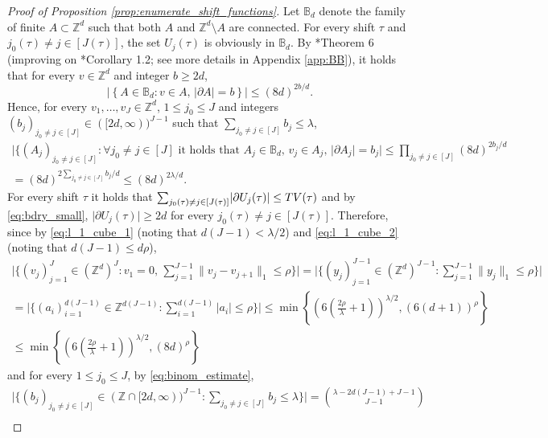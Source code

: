 \documentclass[11pt, reqno]{amsart}
\numberwithin{equation}{section}
\begin{document}
\begin{proof}[Proof of Proposition \ref{prop:enumerate_shift_functions}]
Let ${\mathbb B}_d$ denote the family of finite $A\subset{\mathbb Z}^d$ such that both $A$ and ${\mathbb Z}^d\setminus A$ are connected.
For every shift $\tau$ and $j_0(\tau)\neq j\in[J(\tau)]$, the set $U_j(\tau)$ is obviously in ${\mathbb B}_d$.
By \cite{BB}*{Theorem 6} (improving on \cite{LM}*{Corollary 1.2}; see more details in Appendix \ref{app:BB}), it holds that for every $v\in{\mathbb Z}^d$ and integer $b\geq 2d$, 
\begin{equation}\label{eq:BB}
\lvert \left\{A\in{\mathbb B}_d\colon v\in A,\,\lvert\partial A \rvert=b \right\} \rvert\leq (8d)^{2b/d}.
\end{equation}
Hence, for every $v_1,\ldots,v_J\in{\mathbb Z}^d$, $1\leq j_0\leq J$ and integers $(b_j)_{j_0\neq j\in[J]}\in([2d,\infty))^{J-1}$ such that $\sum_{j_0\neq j\in[J]}b_j\leq\lambda$,
\begin{multline*}
\lvert\{(A_j)_{j_0\neq j\in[J]}\colon \forall j_0\neq j\in[J] \text{ it holds that } A_j\in{\mathbb B}_d,\,v_j\in A_j,\,\lvert\partial A_j\rvert=b_j\rvert\leq \prod_{j_0\neq j\in[J]}(8d)^{2b_j/d}\\
=(8d)^{2\sum_{j_0\neq j\in[J]}b_j/d}\leq(8d)^{2\lambda/d}. 
\end{multline*}
For every shift $\tau$ it holds that $\sum_{j_0(\tau)\neq j\in[J(\tau)]} \lvert\partial U_j(\tau)\rvert\leq {\rm TV}(\tau)$ and by \eqref{eq:bdry_small}, $\lvert\partial U_j(\tau)\rvert\geq 2d$ for every $j_0(\tau)\neq j\in[J(\tau)]$. 
Therefore, since by \eqref{eq:l_1_cube_1} (noting that $d(J-1)<\lambda/2$) and  \eqref{eq:l_1_cube_2} (noting that $d(J-1)\leq d\rho$),
\begin{multline*}
\lvert\{(v_j)_{j=1}^J\in({\mathbb Z}^d)^J\colon  v_1=0,\,\sum_{j=1}^{J-1}\lVert v_j-v_{j+1}\rVert_1\leq\rho\}\rvert=\lvert\{(y_j)_{j=1}^{J-1}\in({\mathbb Z}^d)^{J-1}\colon  \sum_{j=1}^{J-1}\lVert y_j\rVert_1\leq\rho\}\rvert\\
=\lvert\{(a_i)_{i=1}^{d(J-1)}\in{\mathbb Z}^{d(J-1)}\colon \sum_{i=1}^{d(J-1)}\lvert a_i\rvert\leq\rho\}\rvert\leq \min\left\{\left(6\left(\frac{2\rho}{\lambda}+1\right)\right)^{\lambda/2},\left(6(d+1)\right)^{\rho}\right\}\\
\leq \min\left\{\left(6\left(\frac{2\rho}{\lambda}+1\right)\right)^{\lambda/2},\left(8d\right)^{\rho}\right\}
\end{multline*}
and for every $1\leq j_0\leq J$, by \eqref{eq:binom_estimate},
\begin{multline*}
\lvert\{(b_j)_{j_0\neq j\in[J]}\in({\mathbb Z}\cap[2d,\infty))^{J-1}\colon \sum_{j_0\neq j\in[J]}b_j\leq\lambda\}\rvert=\binom{\lambda-2d(J-1)+J-1}{J-1}\\

\end{multline*}
\end{proof}
\end{document}
